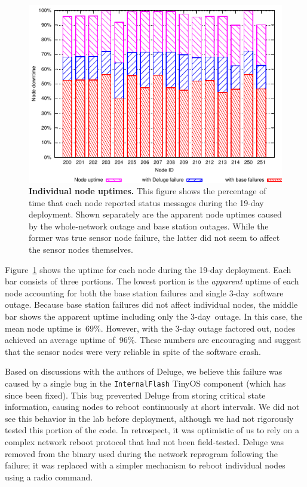 \begin{figure}[t]
\label{evaluation-fig-nodeuptime}
\begin{center}
\includegraphics[width=\hsize]{./5-evaluation/figs/robustness/nodesalive/node-uptime2.pdf}
\end{center}
\caption{\textbf{Individual node uptimes.}
This figure shows the percentage of time that each node reported status
messages during the 19-day deployment.  Shown separately are the apparent
node uptimes caused by the whole-network outage and base station outages.
While the former was true sensor node failure, the latter did not seem to
affect the sensor nodes themselves.}
\end{figure}

Figure~\ref{evaluation-fig-nodeuptime} shows the uptime for each node during
the 19-day deployment. Each bar consists of three portions. The lowest
portion is the {\em apparent} uptime of each node accounting for both the
base station failures and single 3-day~software outage. Because base station
failures did not affect individual nodes, the middle bar shows the apparent
uptime including only the 3-day~outage. In this case, the mean node uptime
is~69\%.  However, with the 3-day outage factored out, nodes achieved an
average uptime of~96\%.  These numbers are encouraging and suggest that the
sensor nodes were very reliable in spite of the software crash.

Based on discussions with the authors of Deluge, we believe this failure was
caused by a single bug in the {\tt InternalFlash} TinyOS component (which has
since been fixed).  This bug prevented Deluge from storing critical state
information, causing nodes to reboot continuously at short intervals.  We did
not see this behavior in the lab before deployment, although we had not
rigorously tested this portion of the code. In retrospect, it was optimistic
of us to rely on a complex network reboot protocol that had not been
field-tested.  Deluge was removed from the binary used during the network
reprogram following the failure; it was replaced with a simpler mechanism to
reboot individual nodes using a radio command.

